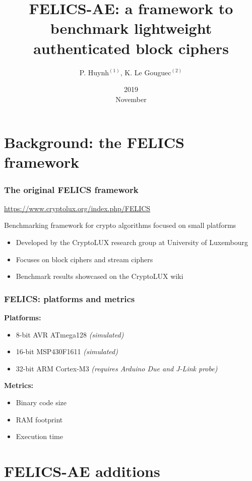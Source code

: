 \documentclass[english]{beamer}
\title{
  FELICS-AE: a framework to benchmark lightweight authenticated block ciphers
}
\date{2019\\ November}
\author{P. Huynh$^{(1)}$, K. Le Gouguec$^{(2)}$}
\institute{$^{(1)}$LORIA CNRS, $^{(2)}$Airbus CyberSecurity}
\begin{document}
\begin{frame}
  \titlepage
\end{frame}

\section[FELICS]{Background: the FELICS framework}

\begin{frame}
  \frametitle{The original FELICS framework}

  \url{https://www.cryptolux.org/index.php/FELICS}

  Benchmarking framework for crypto algorithms focused on small platforms

  \begin{itemize}
  \item Developed by the CryptoLUX research group at University of Luxembourg
  \item Focuses on block ciphers and stream ciphers
  \item Benchmark results showcased on the CryptoLUX wiki
  \end{itemize}

\end{frame}

\begin{frame}
  \frametitle{FELICS: platforms and metrics}

  \textbf{Platforms:}
  \begin{itemize}
  \item 8-bit AVR ATmega128 \emph{(simulated)}
  \item 16-bit MSP430F1611 \emph{(simulated)}
  \item 32-bit ARM Cortex-M3 \emph{(requires Arduino Due and J-Link probe)}
  \end{itemize}

  \pause

  \textbf{Metrics:}
  \begin{itemize}
  \item Binary code size
  \item RAM footprint
  \item Execution time
  \end{itemize}

\end{frame}

\section[FELICS-AE]{FELICS-AE additions}
\end{document}
